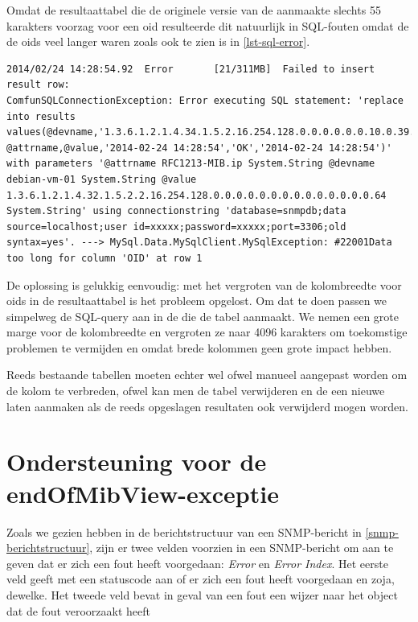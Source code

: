 Omdat de resultaattabel die de originele versie van de \nwmretriever{} aanmaakte slechts 55 karakters voorzag voor een \gls{oid} resulteerde dit natuurlijk
in SQL-fouten omdat de de \glspl{oid} veel langer waren zoals ook te zien is in \cref{lst-sql-error}.


\begin{lstlisting}[float=h, caption={SQL-fout bij te lange \glspl{oid}}, label=lst-sql-error]
2014/02/24 14:28:54.92	Error		[21/311MB]	Failed to insert result row: 
ComfunSQLConnectionException: Error executing SQL statement: 'replace into results values(@devname,'1.3.6.1.2.1.4.34.1.5.2.16.254.128.0.0.0.0.0.0.10.0.39.255.254.109.189.197', @attrname,@value,'2014-02-24 14:28:54','OK','2014-02-24 14:28:54')' with parameters '@attrname RFC1213-MIB.ip System.String @devname debian-vm-01 System.String @value 1.3.6.1.2.1.4.32.1.5.2.2.16.254.128.0.0.0.0.0.0.0.0.0.0.0.0.0.0.64 System.String' using connectionstring 'database=snmpdb;data source=localhost;user id=xxxxx;password=xxxxx;port=3306;old syntax=yes'. ---> MySql.Data.MySqlClient.MySqlException: #22001Data too long for column 'OID' at row 1
\end{lstlisting}

De oplossing is gelukkig eenvoudig: met het vergroten van de kolombreedte voor \glspl{oid} in de resultaattabel is het probleem opgelost.
Om dat te doen passen we simpelweg de SQL-query aan in de \nwmretriever{} die de tabel aanmaakt.
We nemen een grote marge voor de kolombreedte en vergroten ze naar 4096 karakters om toekomstige problemen te vermijden en omdat brede kolommen geen grote impact hebben.

Reeds bestaande tabellen moeten echter wel ofwel manueel aangepast worden om de kolom te verbreden,
ofwel kan men de tabel verwijderen en de \nwmretriever{} een nieuwe laten aanmaken als de reeds opgeslagen resultaten ook verwijderd mogen worden.


\section{Ondersteuning voor de endOfMibView-exceptie}
\label{probleem-endofmibview-exceptie}

Zoals we gezien hebben in de berichtstructuur van een SNMP-bericht in \cref{snmp-berichtstructuur},
zijn er twee velden voorzien in een SNMP-bericht om aan te geven dat er zich een fout heeft voorgedaan: \textit{Error} en \textit{Error Index}.
Het eerste veld geeft met een statuscode aan of er zich een fout heeft voorgedaan en zoja, dewelke.
Het tweede veld bevat in geval van een fout een wijzer naar het object dat de fout veroorzaakt heeft

